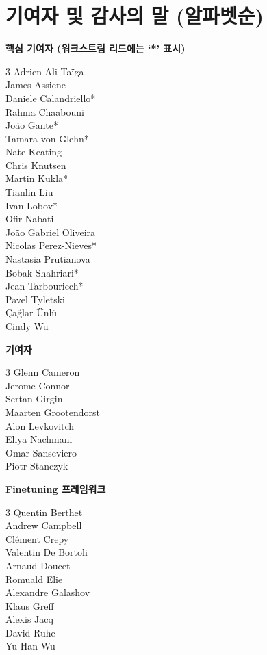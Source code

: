 \section*{기여자 및 감사의 말 (알파벳순)}
\label{sec:contributions}

\noindent\textbf{핵심 기여자 (워크스트림 리드에는 ‘*’ 표시)}

\begin{multicols}{3}
\noindent
Adrien Ali Taïga \\ 
James Assiene \\ 
Daniele Calandriello* \\ 
Rahma Chaabouni \\ 
João Gante*  \\ 
Tamara von Glehn* \\ 
Nate Keating \\ 
Chris Knutsen \\ 
Martin Kukla* \\ 
Tianlin Liu \\ 
Ivan Lobov* \\ 
Ofir Nabati \\ 
João Gabriel Oliveira \\ 
Nicolas Perez-Nieves* \\ 
Nastasia Prutianova \\ 
Bobak Shahriari* \\ 
Jean Tarbouriech* \\ 
Pavel Tyletski \\ 
Çağlar Ünlü \\ 
Cindy Wu
\end{multicols}

\noindent\textbf{기여자}

\begin{multicols}{3}
\noindent
Glenn Cameron \\ 
Jerome Connor \\ 
Sertan Girgin \\ 
Maarten Grootendorst \\ 
Alon Levkovitch \\ 
Eliya Nachmani \\ 
Omar Sanseviero \\ 
Piotr Stanczyk
\end{multicols}

\noindent\textbf{Finetuning 프레임워크}

\begin{multicols}{3}
\noindent
Quentin Berthet \\ 
Andrew Campbell \\ 
Clément Crepy \\ 
Valentin De Bortoli \\ 
Arnaud Doucet \\ 
Romuald Elie \\ 
Alexandre Galashov \\ 
Klaus Greff \\ 
Alexis Jacq \\ 
David Ruhe \\ 
Yu-Han Wu
\end{multicols}

